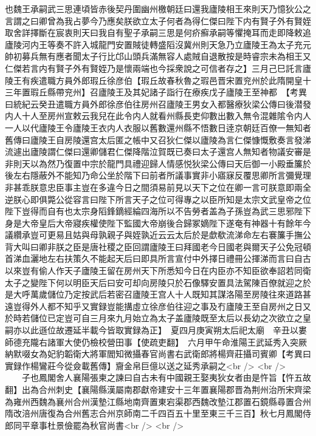 也魏王承嗣武三思連頃皆赤後契丹圍幽州檄朝廷曰還我廬陵相王來則天乃憶狄公之言謂之曰卿曾為我占夢今乃應矣朕欲立太子何者為得仁傑曰陛下内有賢子外有賢姪取舍詳擇斷在宸衷則天曰我自有聖子承嗣三思是何疥癬承嗣等懼掩耳而走即降敕追廬陵河内王等奏不許入城龍門安置賊徒轉盛䧟沒冀州則天急乃立廬陵王為太子充元帥初募兵無有應者聞太子行比邙山頭兵滿無容人處賊自退散按是時睿宗未為相王又仁傑若言内有賢子外有賢姪乃是懷兩端也今採衆說之可信者存之】三月己巳託言廬陵王有疾遣職方員外郎瑕丘徐彦伯【瑕丘故春秋魯之瑕邑晋宋置兖州於此隋開皇十三年置瑕丘縣帶兖州】召廬陵王及其妃諸子詣行在療疾戊子廬陵王至神都　【考異曰統紀云癸丑遣職方員外郎徐彦伯往房州召廬陵王男女入都醫療狄梁公傳曰後潜發内人十人至房州宣敕云我兒在此令内人就看州縣長吏仰數出數入無令混雜隂令内人一人以代廬陵王令廬陵王衣内人衣服以舊數還州縣不悟數日逹京朝廷百僚一無知者舊傳曰廬陵王自房陵還宫太后匿之帳中又召狄仁傑以廬陵為言仁傑慷慨敷奏言發涕流遽出廬陵謂仁傑曰還卿儲君仁傑降階泣賀既已奏曰太子還宫人無知者物議安審是非則天以為然乃復置中宗於龍門具禮迎歸人情感悦狄梁公傳曰天后御一小殿垂簾於後左右隱蔽外不能知乃命公坐於階下曰前者所議事實非小寤寐反覆思卿所言彌覺理非甚乖朕意忠臣事主豈在多違今日之間須易前見以天下之位在卿一言可朕意即兩全逆朕心即俱斃公從容言曰陛下所言天子之位可得專之以臣所知是太宗文武皇帝之位陛下豈得而自有也太宗身䧟鋒鏑經綸四海所以不告勞者盖為子孫豈為武三思邪陛下身是大帝皇后大帝寢疾權使陛下監國大帝崩後合歸冢嫡陛下遂奄有神器十有餘年今議纘承豈可更易且姑與母孰親子與姪孰近云云太后於是歔欷流涕命左右褰簾手撫公背大叫曰卿非朕之臣是唐社稷之臣回謂廬陵王曰拜國老今日國老與爾天子公免冠頓首涕血灑地左右扶策久不能起天后曰即具所言宣付中外擇日禮冊公揮涕而言曰自古以來豈有偷人作天子廬陵王留在房州天下所悉知今日在内臣亦不知臣欲奉詔若同衛太子之變陛下何以明臣天后曰安可却向房陵只於石像驛安置具法駕陳百僚就迎之於是大呼萬歲儲位乃定按武后若密召廬陵王宫人十人既知其謀洛陽至房陵往來道路甚遠豈得外人都不知乎又實録豈能搆虛立徐彦伯往迎之事及冇廬陵王至自房州之日又於時若儲位已定豈可自三月來九月始立為太子盖廬陵既至太后以長幼之次欲立之皇嗣亦以此遜位故遷延半載今皆取實録為正】　夏四月庚寅朔太后祀太廟　辛丑以婁師德充隴右諸軍大使仍檢校營田事【使疏吏翻】　六月甲午命淮陽王武延秀入突厥納默啜女為妃豹韜衛大將軍閻知微攝春官尚書右武衛郎將楊齊莊攝司賓卿【考異曰實録作楊鸞莊今從僉載舊傳】齎金帛巨億以送之延秀承嗣之<br />
<br />
　　子也鳳閣舍人襄陽張柬之諫曰自古未有中國親王娶夷狄女者由是忤旨【忤五故翻】出為合州刺史【襄陽縣漢屬南郡獻帝建安十三年置襄陽郡晋為荆州治所宋齊梁為雍州西魏為襄州合州漢墊江縣地南齊置東宕渠郡西魏改墊江郡置石鏡縣尋置合州隋改涪州唐復為合州舊志合州京師南二千四百五十里至東三千三百】秋七月鳳閣侍郎同平章事杜景儉罷為秋官尚書<br />
<br />
